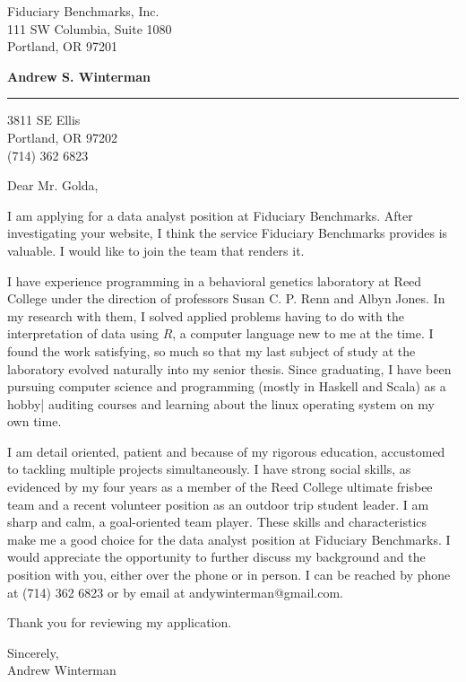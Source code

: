 \documentclass[11pt]{letter} %
\begin{document}
\longindentation=0pt                       %
\let\raggedleft\raggedright                %
 
\begin{letter}{
Fiduciary Benchmarks, Inc. \\
111 SW Columbia,
Suite 1080 \\
Portland, OR 97201 \\ }

\begin{center}
\large \bf{Andrew S. Winterman} \end{center}
\medskip\hrule height 1pt
\begin{center}
3811 SE Ellis \\ Portland, OR 97202 \\ (714) 362 6823
\end{center}  



\opening{Dear Mr. Golda,} 
 
 I am applying for a data analyst position at Fiduciary Benchmarks. After investigating your website, I think the service Fiduciary Benchmarks provides is valuable. I would like to join the team that renders it.
 
 I have experience programming in a behavioral genetics laboratory at Reed College under the direction of professors Susan C. P. Renn and Albyn Jones. In my research with them, I solved applied problems having to do with the interpretation of data using $R$, a computer language new to me at the time. I found the work satisfying, so much so that my last subject of study at the laboratory evolved naturally into my senior thesis. Since graduating, I have been pursuing  computer science and programming (mostly in Haskell  and Scala) as a hobby| auditing courses and learning about the linux operating system on my own time.
 
 I am detail oriented, patient and because of my rigorous education,  accustomed to tackling multiple projects simultaneously. I have strong social skills, as evidenced by my four years as a member of the Reed College ultimate frisbee team and a recent volunteer position as an outdoor trip student leader. I am sharp and calm, a goal-oriented team player. These skills and characteristics make me a good choice for the data analyst position at Fiduciary Benchmarks. I would appreciate the opportunity to further discuss my background and the position with you, either over the phone or in person. I can be reached by phone at (714) 362 6823 or by email at andywinterman@gmail.com. 

Thank you for reviewing my application.

Sincerely, \\
Andrew Winterman

\end{letter}
 
\end{document}
